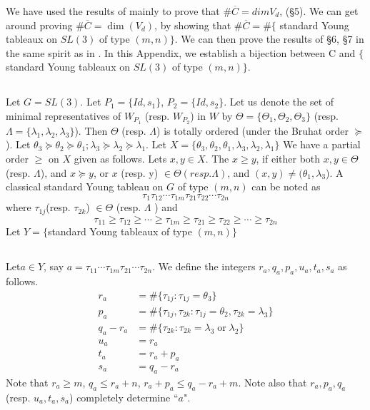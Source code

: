 We have used the results of \cite{chap9-keyL2} mainly to prove that $\#\overline{C}= dimV_{d}$, (\S 5). We can get
around proving $\#\overline{C}= \dim(V_{d})$, by showing that $\#\overline{C}= \#\{$ standard Young tableaux on $SL(3)$ of type $(m,n)\}$. We can then prove the results of \S 6, \S 7 in the same spirit as in \cite{chap9-keyLS}. In this Appendix, we establish a bijection between C and $\{$standard Young tableaux on $SL(3)$ of type $(m,n)\}$. 

\subsection{}\label{chap9-subsec-8.1}
Let $G = SL(3)$. Let $P_{1}= \{Id, s_{1}\}$, $P_{2} = \{Id, s_{2}\}$. Let us denote the set of minimal representatives of $W_{P_{1}}$ (resp. $W_{P_{2}}$) in $W$ by $\Theta = \{ \Theta_{1}, \Theta_{2},\Theta_{3}\}$ (resp. $\Lambda=\{ \lambda_{1},\lambda_{2}, \lambda_{3}\}$). Then $\Theta$ (resp. $\Lambda$) is totally ordered (under the Bruhat order $\succeq$ ). Let $\theta_{3} \succeq \theta_{2} \succeq \theta_{1}; \lambda_{3} \succeq \lambda_{2} \succeq \lambda_{1}$. Let $X= \{ \theta_{3}, \theta_{2}, \theta_{1}, \lambda_{3}, \lambda_{2}, \lambda_{1}\}$ We have a partial order $\geq$ on $X$ given as follows. Lets $x,y \in X$. The $x \geq y$, if either both $ x,y \in \Theta$ (resp. $\Lambda$), and $x \succeq y$, or $x$ (resp. y) $\in \Theta (resp. \Lambda)$, and $(x,y) \neq (\theta_{1},\lambda_{3}$). A classical standard Young tableau on $G$ of type $(m,n)$ can  be noted as
 $$
\tau_{1}\tau_{12}\cdots \tau_{1m}\tau_{21}\tau_{22}\cdots \tau_{2n}
 $$
where $\tau_{1j}$(resp. $\tau_{2k}$) $\in \Theta$ (resp. $\Lambda$ ) and
$$
\tau_{11} \geq \tau_{12} \geq \cdots \geq \tau_{1m} \geq \tau_{21} \geq \tau_{22} \geq \cdots \geq \tau_{2n}
$$
Let $Y =\{$standard Young tableaux of type $(m,n)\}$

\subsection{}\label{chap9-subsec-8.2}
Let\pageoriginale $a \in Y$, say $a = \tau_{11} \cdots \tau_{1m}\tau_{21} \cdots \tau_{2n}$. We define the integers $r_{a}, q_{a}, p_{a}, u_{a}, t_{a}, s_{a}$ as follows.
\begin{align*}
r_{a} &= \#\{\tau_{1j}: \tau_{1j} = \theta_{3} \}\\
p_{a} &= \# \{\tau_{1j}, \tau_{2k} : \tau_{1j}= \theta_{2}, \tau_{2k} = \lambda_{3} \}\\
q_{a}-r_{a} &= \# \{ \tau_{2k} : \tau_{2k} = \lambda_{3} \; \text{or} \; \lambda_{2} \}\\
u_{a} &= r_{a}\\
t_{a} &= r_{a}+p_{a}\\
s_{a} &= q_{a}-r_{a}
\end{align*}
Note that $ r_{a} \geq m$, $ q_{a}\leq r_{a} + n$, $r_{a} + p_{a} \leq q_{a}-r_{a} +m$. Note also that $r_{a}, p_{a}, q_{a}$ (resp. $u_{a}, t_{a}, s_{a}$) completely determine ``$a$". 

